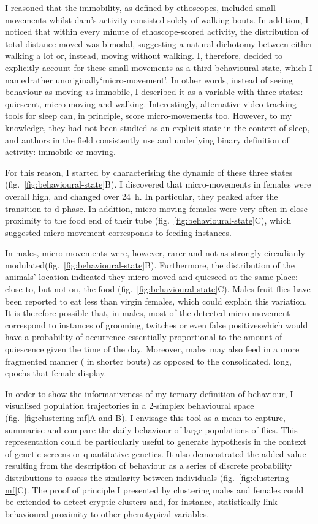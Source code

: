 I reasoned that the immobility, as defined by ethoscopes, included small movements whilst \gls{dam}'s activity consisted solely of walking bouts.
In addition, I noticed that within every minute of ethoscope-scored activity, the distribution of total distance moved was bimodal, 
suggesting a natural dichotomy between either walking a lot or, instead, moving without walking.
I, therefore, decided to explicitly account for these small movements as a third behavioural state, which I named\emd{}rather unoriginally\emd{}`micro-movement'.
In other words, instead of seeing behaviour as moving \emph{vs} immobile, I described it as a variable with three states: quiescent, micro-moving and walking.
Interestingly, alternative video tracking tools for sleep can, in principle, score micro-movements too\cite{zimmerman_video_2008}.
However, to my knowledge, they had not been studied as an explicit state in the context of sleep,
and authors in the field consistently use and underlying binary definition of activity: immobile or moving.

For this reason, I started by characterising the dynamic of these three states (fig.~\ref{fig:behavioural-state}B).
I discovered that micro-movements in females were overall high, and changed over 24~h.
In particular, they peaked after the transition to \gls{d} phase.
In addition, micro-moving females were very often in close proximity to the food end of their tube (fig.~\ref{fig:behavioural-state}C), which suggested micro-movement corresponds to feeding instances.

In males, micro movements were, however, rarer and not as strongly circadianly modulated(fig.~\ref{fig:behavioural-state}B).
Furthermore, the distribution of the animals' location indicated they micro-moved and quiesced at the same place: close to, but not on, the food  (fig.~\ref{fig:behavioural-state}C).
Males fruit flies have been reported to eat less  than virgin females\cite{meunier_regulation_2007}, which could explain this variation.
It is therefore possible that, in males, most of the detected micro-movement correspond to instances of grooming, twitches or even false positives\emd{}which would have a probability of occurrence essentially proportional to the amount of quiescence given the time of the day.
Moreover, males may also feed in a more fragmented manner (\ie{} in shorter bouts) as opposed to the consolidated, long, epochs that female display.

In order to show the informativeness of my ternary definition of behaviour, I visualised population trajectories in a 2-simplex behavioural space (fig.~\ref{fig:clustering-mf}A and B).
I envisage this tool as a mean to capture, summarise and compare the daily behaviour of large populations of flies.
This representation could be particularly useful to generate hypothesis in the context of genetic screens or quantitative genetics. 
It also demonstrated the added value resulting from the description of behaviour as a series of discrete probability distributions to assess the similarity between individuals (fig.~\ref{fig:clustering-mf}C).
The proof of principle I presented by clustering males and females could be extended to detect cryptic clusters and, for instance, statistically link behavioural proximity to other phenotypical variables.

